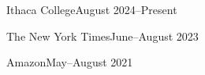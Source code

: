   {Ithaca College}{August 2024--Present}{}{}

  {The New York Times}{June--August 2023}{}{}

  {Amazon}{May--August 2021}{}{}
